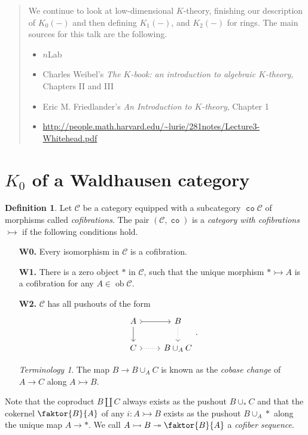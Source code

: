 \documentclass[10pt,letterpaper,cm]{nupset}
\theoremstyle{definition}
\newtheorem{definition}{Definition}[section]
\theoremstyle{theorem}
\theoremstyle{remark}
\newtheorem*{term}{Terminology}
\newcommand{\1}{\mathbf{1}}
\renewcommand{\c}{\mathscr{C}}
\newcommand{\0}{\vec 0}
\DeclareMathOperator{\ob}{ob}
\DeclareMathOperator{\co}{\mathtt{co}}
\begin{document}
\begin{abstract}
We continue to look at low-dimensional $K$-theory, finishing our description of $K_0(-)$ and then defining $K_1(-)$, and $K_2(-)$ for rings. The main sources for this talk are the following.
\begin{itemize}
\item $n$Lab
\item Charles Weibel's \textit{The $K$-book: an introduction to algebraic $K$-theory}, Chapters II and III
\item Eric M. Friedlander's \textit{An Introduction to $K$-theory}, Chapter 1
\item \url{http://people.math.harvard.edu/~lurie/281notes/Lecture3-Whitehead.pdf}
\end{itemize}
\end{abstract}

\smallskip

\section{$K_0$ of a Waldhausen category}

\begin{definition}
Let $\c$ be a category equipped with a subcategory $\co{\c}$ of morphisms called \textit{cofibrations}. The pair $\left(\c, \co\right)$ is a \textit{category with cofibrations $\rightarrowtail$} if the following conditions hold.
\begin{itemize}
\item[\textbf{W0.}] Every isomorphism in $\c$ is a cofibration.
\item[\textbf{W1.}] There is a zero object $\ast$ in $\c$, such that the unique morphism $\ast \rightarrowtail A$ is a cofibration for any $A \in \ob \c$.
\item[\textbf{W2.}] $\c$ has all pushouts of the form
\[
\begin{tikzcd}
A \arrow[d] \arrow[r, tail] & B \arrow[d, dotted] \\
C \arrow[r, dotted, tail] & B \cup_A C
\end{tikzcd}.
\]
\begin{term}
The map $B \to B\cup_{A} C$ is known as the \textit{cobase change} of $A \to C$ along $A \rightarrowtail B$.
 \end{term}
\end{itemize}
\end{definition}


Note that the coproduct $B \coprod C$ always exists as the pushout $B \cup_{\ast} C$ and that the cokernel $\faktor{B}{A}$ of any $i : A \rightarrowtail B$ exists as the pushout $B \cup_A \ast$ along the unique map $A \to \ast$. We call $A \rightarrowtail  B \twoheadrightarrow \faktor{B}{A}$ a \textit{cofiber sequence}.
\end{document}
